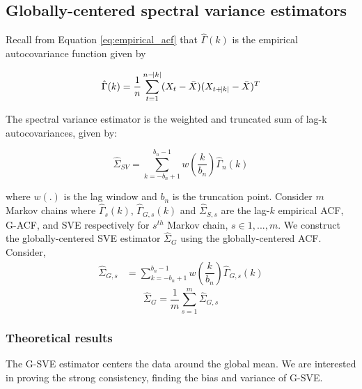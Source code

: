 \documentclass[11pt]{article}
\theoremstyle{remark}
\begin{document}
\subsection{Globally-centered spectral variance estimators} %
\label{sub:globally_centered_spectral_variance_estimators}


Recall from Equation \ref{eq:empirical_acf} that $\hat{\Gamma}(k)$ is the empirical autocovariance function given by 

\begin{equation}
    \hat{\Gamma}(k) = \dfrac{1}{n}\sum_{t=1}^{n-\abs{k}}(X_t - \bar{X})(X_{t + \abs{k}} - \bar{X})^T
\end{equation}


The spectral variance estimator is the weighted and truncated sum of lag-k autocovariances, given by:

\begin{equation} \label{eq:sve}
    \hat{\Sigma}_{SV} = \sum_{k=-b_n+1}^{b_n-1}w\left(\dfrac{k}{b_n}\right)\hat{\Gamma}_n(k)
\end{equation}

where $w(.)$ is the lag window and $b_n$ is the truncation point. Consider $m$ Markov chains where $\hat{\Gamma}_s(k)$, $\hat{\Gamma}_{G,s}(k)$ and $\hat{\Sigma}_{S, s}$ are the lag-$k$ empirical ACF, G-ACF, and SVE respectively for $s^{th}$ Markov chain, $s\in {1,...,m}$. We construct the globally-centered SVE estimator $\hat{\Sigma}_{G}$ using the globally-centered ACF. Consider, 
%
\begin{align*}
    \hat{\Sigma}_{G,s} &= \sum_{k=-b_n+1}^{b_n-1}w\left(\dfrac{k}{b_n}\right)\hat{\Gamma}_{G,s}(k)
\end{align*}
\[
\hat{\Sigma}_{G} =  \dfrac{1}{m}\sum_{s=1}^{m}\hat{\Sigma}_{G,s}
\]


\subsubsection{Theoretical results} \label{sec:G-SVE}

The G-SVE estimator centers the data around the global mean. We are interested in proving the strong consistency, finding the bias and variance of G-SVE. 
\end{document}
